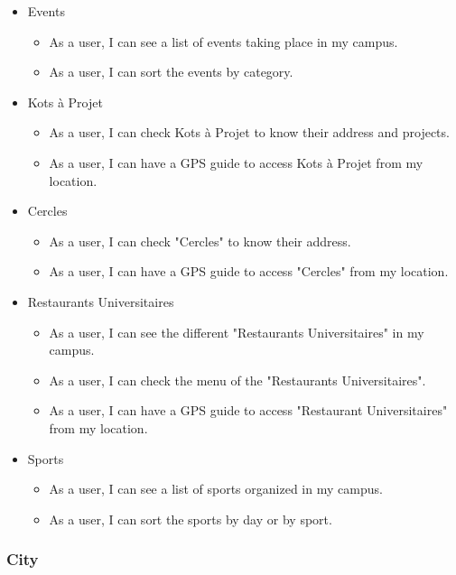 \documentclass[11pt, a4paper]{report}
\begin{document}
\begin{itemize}

\item{Events}
\begin{itemize} 
\item As a user, I can see a list of events taking place in my campus.
\item As a user, I can sort the events by category.
\end{itemize}

\item{Kots à Projet}
\begin{itemize}
\item As a user, I can check Kots à Projet to know their address and projects.
\item As a user, I can have a GPS guide to access Kots à Projet from my location.
\end{itemize}

\item{Cercles}
\begin{itemize}
\item As a user, I can check "Cercles" to know their address.
\item As a user, I can have a GPS guide to access "Cercles" from my location.
\end{itemize}

\item{Restaurants Universitaires}
\begin{itemize}
\item As a user, I can see the different "Restaurants Universitaires" in my campus.
\item As a user, I can check the menu of the "Restaurants Universitaires".
\item As a user, I can have a GPS guide to access "Restaurant Universitaires" from my location.
\end{itemize}

\item{Sports}
\begin{itemize}
\item As a user, I can see a list of sports organized in my campus.
\item As a user, I can sort the sports by day or by sport.
\end{itemize}

\end{itemize}

\subsubsection{City}
\end{document}
